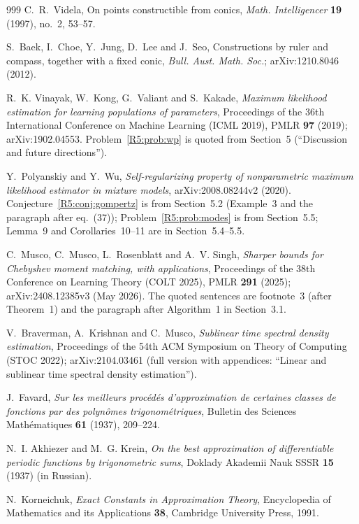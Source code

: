 \documentclass[11pt]{amsart}
\theoremstyle{definition}
\theoremstyle{remark}
\begin{document}
\begin{thebibliography}{999}
C.~R.~Videla, On points constructible from conics, \emph{Math. Intelligencer} \textbf{19} (1997), no.~2, 53--57.

S.~Baek, I.~Choe, Y.~Jung, D.~Lee and J.~Seo, Constructions by ruler and compass, together with a fixed conic, \emph{Bull. Aust. Math. Soc.}; arXiv:1210.8046 (2012).

R.~K. Vinayak, W.~Kong, G.~Valiant and S.~Kakade,
\emph{Maximum likelihood estimation for learning populations of parameters},
Proceedings of the 36th International Conference on Machine Learning (ICML 2019),
PMLR \textbf{97} (2019); arXiv:1902.04553.
Problem~\ref{R5:prob:wp} is quoted from Section~5 (``Discussion and future directions'').

Y.~Polyanskiy and Y.~Wu,
\emph{Self-regularizing property of nonparametric maximum likelihood estimator in mixture models},
arXiv:2008.08244v2 (2020).
Conjecture~\ref{R5:conj:gompertz} is from Section~5.2 (Example~3 and the paragraph after eq.~(37));
Problem~\ref{R5:prob:modes} is from Section~5.5; Lemma~9 and Corollaries~10--11 are in Section~5.4--5.5.

C.~Musco, C.~Musco, L.~Rosenblatt and A.~V. Singh,
\emph{Sharper bounds for Chebyshev moment matching, with applications},
Proceedings of the 38th Conference on Learning Theory (COLT 2025), PMLR \textbf{291} (2025);
arXiv:2408.12385v3 (May 2026).
The quoted sentences are footnote~3 (after Theorem~1) and the paragraph after Algorithm~1 in Section~3.1.

V.~Braverman, A.~Krishnan and C.~Musco,
\emph{Sublinear time spectral density estimation},
Proceedings of the 54th ACM Symposium on Theory of Computing (STOC 2022);
arXiv:2104.03461 (full version with appendices: ``Linear and sublinear time spectral density estimation'').

J.~Favard,
\emph{Sur les meilleurs proc\'ed\'es d'approximation de certaines classes de fonctions par des polyn\^omes trigonom\'etriques},
Bulletin des Sciences Math\'ematiques \textbf{61} (1937), 209--224.

N.~I. Akhiezer and M.~G. Krein,
\emph{On the best approximation of differentiable periodic functions by trigonometric sums},
Doklady Akademii Nauk SSSR \textbf{15} (1937) (in Russian).

N.~Korneichuk,
\emph{Exact Constants in Approximation Theory},
Encyclopedia of Mathematics and its Applications \textbf{38}, Cambridge University Press, 1991.


\end{thebibliography}
\end{document}
